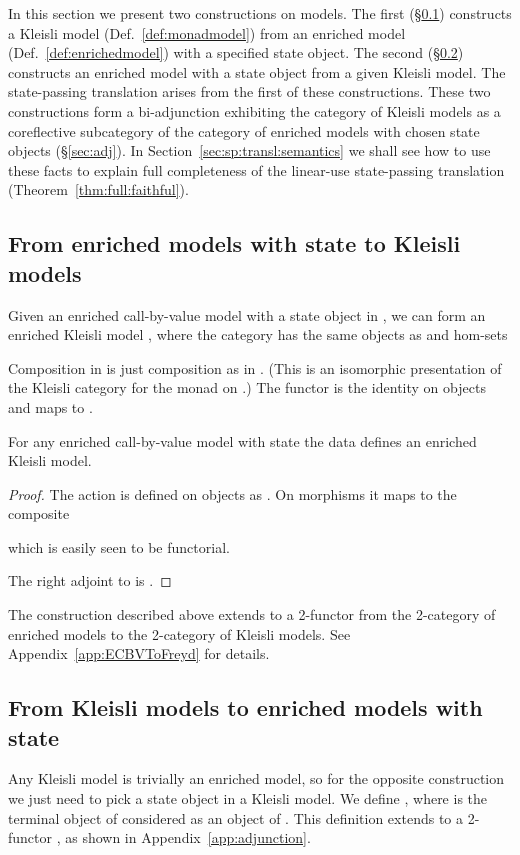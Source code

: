 \documentclass{LMCS}
\newcommand{\Klmodel}{enriched Kleisli model}
\newcommand{\enrmodel}{enriched call-by-value model}
\begin{document}
In this section we present two constructions on models. The first 
(\S\ref{sec:enrtokleisli})
constructs a Kleisli model (Def.~\ref{def:monadmodel})
from an enriched model (Def.~\ref{def:enrichedmodel})
with a specified
state object.  The second (\S\ref{sec:kleisli-to-enriched-models})
constructs an enriched model with a state
object from a given Kleisli model. The state-passing translation
arises from the first of these constructions. These two constructions
form a bi-adjunction exhibiting the category of Kleisli models as a
coreflective subcategory of the category of enriched models with chosen
state objects (\S\ref{sec:adj}).  
In Section~\ref{sec:sp:transl:semantics} we shall see
how to use these facts to explain full completeness of the 
linear-use state-passing
translation
(Theorem~\ref{thm:full:faithful}).

\subsection{From enriched models with state to Kleisli models}\label{sec:enrtokleisli}

Given an {\enrmodel}  with a state object 
in , we can form an {\Klmodel} , where the category 
has the same objects as  and hom-sets

Composition in  is just composition as in . (This is an isomorphic presentation of the Kleisli category for the monad  on .) The functor  is the identity on objects and maps  to  .

\begin{lem} \label{lem:Kl:well-def}
For any {\enrmodel} with state  the data  defines an {\Klmodel}.
\end{lem}

\begin{proof}
The action  is defined on objects as . On morphisms it maps  to the composite

which is easily seen to be functorial. 

The right adjoint to  is . \end{proof}

The construction  described above extends to a 2-functor 
from the 2-category of enriched models to the 2-category of 
Kleisli models.
See Appendix~\ref{app:ECBVToFreyd} for details.


\subsection{From Kleisli models to enriched models with state}
\label{sec:kleisli-to-enriched-models}
Any Kleisli model is trivially an enriched model, so for the opposite
construction we just need to pick a state object in a Kleisli
model. We define , where  is the terminal object of  considered 
as an object of .
This definition
extends to a 2-functor ,
as shown in Appendix~\ref{app:adjunction}.
\end{document}
